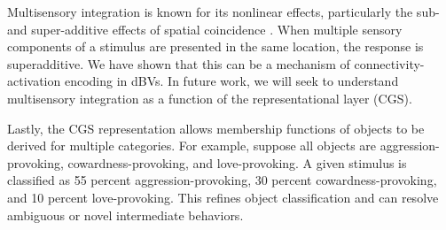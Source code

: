 \documentclass[letterpaper]{article}
\begin{document}
Multisensory integration is known for its nonlinear effects, particularly the sub- and super-additive effects of spatial coincidence \citep{[20]}. When multiple sensory components of a stimulus are presented in the same location, the response is superadditive. We have shown that this can be a mechanism of connectivity-activation encoding in dBVs. In future work, we will seek to understand multisensory integration as a function of the representational layer (CGS).

Lastly, the CGS representation allows membership functions of objects to be derived for multiple categories. For example, suppose all objects are aggression-provoking, cowardness-provoking, and love-provoking. A given stimulus is classified as 55 percent aggression-provoking, 30 percent cowardness-provoking, and 10 percent love-provoking. This refines object classification and can resolve ambiguous or novel intermediate behaviors.

\footnotesize


\end{document}
